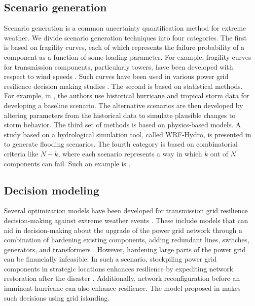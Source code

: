 \documentclass[authoryear,preprint,review,12pt]{elsarticle}\usepackage{amssymb}
\begin{document}
\subsection{Scenario generation}
Scenario generation is a common uncertainty quantification method for extreme weather. We divide scenario generation techniques into four categories. The first is based on fragility curves, each of which represents the failure probability of a component as a function of some loading parameter. For example, fragility curves for transmission components, particularly towers,  have been developed with respect to wind speeds \cite{MA2022108072}. Such curves have been used in various power grid resilience decision making studies \cite{seth_2021, Panteli_boosting}. The second is based on statistical methods. For example, in \cite{Staid2014}, the authors use historical hurricane and tropical storm data for developing a baseline scenario. The alternative scenarios are then developed by altering parameters from the historical data to simulate plausible changes to storm behavior. The third set of methods is based on physics-based models. A study based on a hydrological simulation tool, called WRF-Hydro, is presented in \cite{kyoung_paper,SOUTO2022107545} to generate flooding scenarios. The fourth category is based on combinatorial criteria like $N-k$, where each scenario represents a way in which $k$ out of $N$ components can fail. Such an example is \cite{9470975}.

\subsection{Decision modeling} \label{decision_model}
Several optimization models have been developed for transmission grid resilience decision-making against extreme weather events \cite{roald_power_2023}. These include models that can aid in decision-making about the upgrade of the power grid network through a combination of hardening existing components, adding redundant lines, switches, generators, and transformers \cite{9470975,9842364, 7540988}. However, hardening large parts of the power grid can be financially infeasible. In such a scenario, stockpiling power grid components in strategic locations enhances resilience by expediting network restoration after the disaster
\cite{Coffrin2011}. Additionally, network reconfiguration before an imminent hurricane can also enhance resilience. The model proposed in \cite{Panteli_boosting} makes such decisions using grid islanding.
\end{document}
